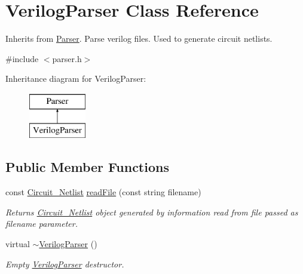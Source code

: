 \hypertarget{classVerilogParser}{\section{Verilog\-Parser Class Reference}
\label{classVerilogParser}
}


Inherits from \hyperlink{classParser}{Parser}. Parse verilog files. Used to generate circuit netlists.  




{\ttfamily \#include $<$parser.\-h$>$}

Inheritance diagram for Verilog\-Parser\-:\begin{figure}[H]
\begin{center}
\leavevmode
\includegraphics[height=2.000000cm]{classVerilogParser}
\end{center}
\end{figure}
\subsection*{Public Member Functions}
\begin{DoxyCompactItemize}
\item 
const \hyperlink{classCircuit__Netlist}{Circuit\-\_\-\-Netlist} \hyperlink{classVerilogParser_a9f8740c184e8129a87597a1eae3ed3c4}{read\-File} (const string filename)
\begin{DoxyCompactList}\small\item\em Returns \hyperlink{classCircuit__Netlist}{Circuit\-\_\-\-Netlist} object generated by information read from file passed as filename parameter. \end{DoxyCompactList}\item 
\hypertarget{classVerilogParser_aee565da994b012a04f4d7120b9148ab3}{virtual \hyperlink{classVerilogParser_aee565da994b012a04f4d7120b9148ab3}{$\sim$\-Verilog\-Parser} ()}\label{classVerilogParser_aee565da994b012a04f4d7120b9148ab3}

\begin{DoxyCompactList}\small\item\em Empty \hyperlink{classVerilogParser}{Verilog\-Parser} destructor. \end{DoxyCompactList}\end{DoxyCompactItemize}
